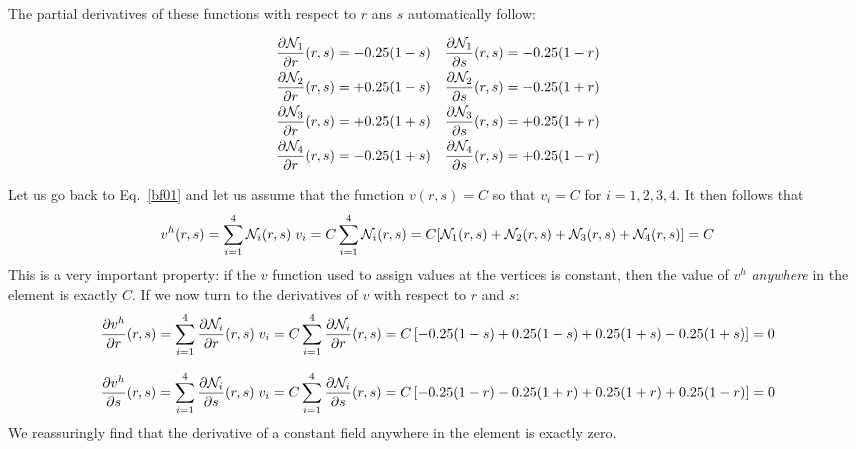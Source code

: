 The partial derivatives of these functions with respect to $r$ ans $s$ automatically follow:
\begin{mdframed}[backgroundcolor=blue!5]
\begin{align}
\frac{\partial {\mathcal{N}}_1}{\partial r}(r,s)&= - 0.25(1-s) &
\frac{\partial {\mathcal{N}}_1}{\partial s}(r,s)&= - 0.25(1-r) \nonumber\\
\frac{\partial {\mathcal{N}}_2}{\partial r}(r,s)&= + 0.25(1-s) &
\frac{\partial {\mathcal{N}}_2}{\partial s}(r,s)&= - 0.25(1+r) \nonumber\\
\frac{\partial {\mathcal{N}}_3}{\partial r}(r,s)&= + 0.25(1+s) &
\frac{\partial {\mathcal{N}}_3}{\partial s}(r,s)&= + 0.25(1+r) \nonumber\\
\frac{\partial {\mathcal{N}}_4}{\partial r}(r,s)&= - 0.25(1+s) &
\frac{\partial {\mathcal{N}}_4}{\partial s}(r,s)&= + 0.25(1-r) \nonumber
\end{align}
\end{mdframed}
Let us go back to Eq.~\eqref{bf01} and let us assume that the 
function $v(r,s)=C$ so that $v_i=C$ for $i=1,2,3,4$. 
It then follows that 
\[
v^h(r,s) = \sum_{i=1}^4 {\mathcal{N}}_i(r,s)\;  v_i 
=C \sum_{i=1}^4 {\mathcal{N}}_i(r,s)
=C [
{\mathcal{N}}_1(r,s)
+{\mathcal{N}}_2(r,s)
+{\mathcal{N}}_3(r,s)
+{\mathcal{N}}_4(r,s)]=C
\]
This is a very important property: if the $v$ function used to 
assign values at the vertices is constant, then 
the value of $v^h$ {\it anywhere} in the element is exactly $C$.
If we now turn to the derivatives of $v$ with respect to $r$ and $s$:
\[
\frac{\partial {v}^h}{\partial r}(r,s) 
= \sum_{i=1}^4 \frac{\partial {\mathcal{N}}_i}{\partial r}(r,s)\;  v_i 
= C \sum_{i=1}^4 \frac{\partial {\mathcal{N}}_i}{\partial r}(r,s) 
= C \left[ - 0.25(1-s)  + 0.25(1-s)  + 0.25(1+s)  - 0.25(1+s) \right] = 0 
\]

\[
\frac{\partial v^h}{\partial s}(r,s) 
= \sum_{i=1}^4 \frac{\partial {\mathcal{N}}_i}{\partial s}(r,s)\;  v_i 
= C \sum_{i=1}^4 \frac{\partial {\mathcal{N}}_i}{\partial s}(r,s) 
= C \left[ - 0.25(1-r) - 0.25(1+r) + 0.25(1+r) + 0.25(1-r) \right] = 0 
\]
We reassuringly find that the derivative of a constant field anywhere in the element is exactly zero.

